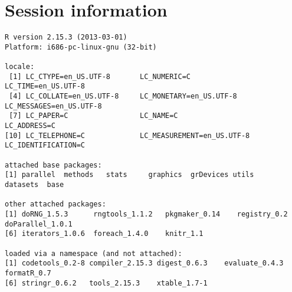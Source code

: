 \documentclass[a4paper,12pt]{article}\usepackage{graphicx, color}
\makeatletter
\newenvironment{kframe}{%
 \def\at@end@of@kframe{}%
 \ifinner\ifhmode%
  \def\at@end@of@kframe{\end{minipage}}%
  \begin{minipage}{\columnwidth}%
 \fi\fi%
 \def\FrameCommand##1{\hskip\@totalleftmargin \hskip-\fboxsep
 \colorbox{shadecolor}{##1}\hskip-\fboxsep
     \hskip-\linewidth \hskip-\@totalleftmargin \hskip\columnwidth}%
 \MakeFramed {\advance\hsize-\width
   \@totalleftmargin\z@ \linewidth\hsize
   \@setminipage}}%
 {\par\unskip\endMakeFramed%
 \at@end@of@kframe}
\newenvironment{knitrout}{}{} %
\renewenvironment{knitrout}{\begin{footnotesize}}{\end{footnotesize}}
\makeatother
\begin{document}
\section*{Session information}
\begin{knitrout}
\color{fgcolor}\begin{kframe}
\begin{verbatim}
R version 2.15.3 (2013-03-01)
Platform: i686-pc-linux-gnu (32-bit)

locale:
 [1] LC_CTYPE=en_US.UTF-8       LC_NUMERIC=C               LC_TIME=en_US.UTF-8       
 [4] LC_COLLATE=en_US.UTF-8     LC_MONETARY=en_US.UTF-8    LC_MESSAGES=en_US.UTF-8   
 [7] LC_PAPER=C                 LC_NAME=C                  LC_ADDRESS=C              
[10] LC_TELEPHONE=C             LC_MEASUREMENT=en_US.UTF-8 LC_IDENTIFICATION=C       

attached base packages:
[1] parallel  methods   stats     graphics  grDevices utils     datasets  base     

other attached packages:
[1] doRNG_1.5.3      rngtools_1.1.2   pkgmaker_0.14    registry_0.2     doParallel_1.0.1
[6] iterators_1.0.6  foreach_1.4.0    knitr_1.1       

loaded via a namespace (and not attached):
[1] codetools_0.2-8 compiler_2.15.3 digest_0.6.3    evaluate_0.4.3  formatR_0.7    
[6] stringr_0.6.2   tools_2.15.3    xtable_1.7-1   
\end{verbatim}
\end{kframe}
\end{knitrout}


\printbibliography[heading=bibintoc]
\end{document}
